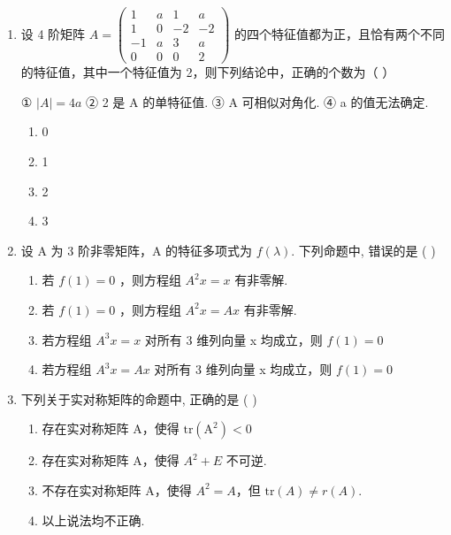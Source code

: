\documentclass[12pt, a4paper]{ctexart}
\begin{document}
\begin{enumerate}
    \item 设 4 阶矩阵 $ A = \begin{pmatrix} 1 & a & 1 & a \\ 1 & 0 & -2 & -2 \\ -1 & a & 3 & a \\ 0 & 0 & 0 & 2 \end{pmatrix} $ 的四个特征值都为正，且恰有两个不同的特征值，其中一个特征值为 2，则下列结论中，正确的个数为（ \underline{\hspace{1cm}} ）
    
    ① $ \left|A\right|=4a $ ② 2 是 A 的单特征值. ③ A 可相似对角化. ④ a 的值无法确定.
    \begin{enumerate}[label=(\Alph*)]
        \item 0
        \item 1
        \item 2
        \item 3
    \end{enumerate}

    \item 设 A 为 3 阶非零矩阵，A 的特征多项式为 $ f(\lambda) $. 下列命题中, 错误的是 ( \underline{\hspace{1cm}} )
    \begin{enumerate}[label=(\Alph*)]
        \item 若 $ f(1)=0 $ ，则方程组 $ A^{2}x=x $ 有非零解.
        \item 若 $ f(1)=0 $ ，则方程组 $ A^{2}x=Ax $ 有非零解.
        \item 若方程组 $ A^{3}x=x $ 对所有 3 维列向量 x 均成立，则 $ f(1)=0 $
        \item 若方程组 $ A^{3}x=Ax $ 对所有 3 维列向量 x 均成立，则 $ f(1)=0 $
    \end{enumerate}

    \item 下列关于实对称矩阵的命题中, 正确的是 ( \underline{\hspace{1cm}} )
    \begin{enumerate}[label=(\Alph*)]
        \item 存在实对称矩阵 A，使得 $ \mathrm{tr}\left(\mathrm{A}^{2}\right)<0 $
        \item 存在实对称矩阵 A，使得 $ A^{2} + E $ 不可逆.
        \item 不存在实对称矩阵 A，使得 $ A^{2}=A $，但 $ \mathrm{tr}(A)\neq r(A) $.
        \item 以上说法均不正确.
    \end{enumerate}


\end{enumerate}
\end{document}

